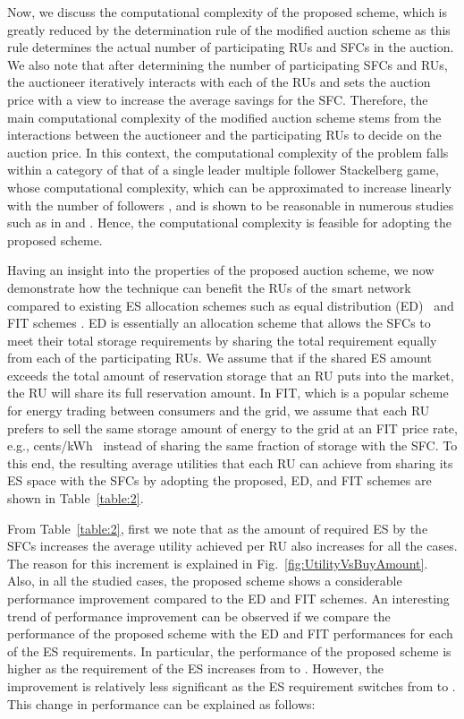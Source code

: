 \documentclass[journal,10pt]{IEEEtran}
\begin{document}
Now, we discuss the computational complexity of the proposed scheme, which is greatly reduced by the determination rule of the modified auction scheme as this rule determines the actual number of participating RUs and SFCs in the auction. We also note that after determining the number of participating SFCs and RUs, the auctioneer iteratively interacts with each of the RUs and sets the auction price with a view to increase the average savings for the SFC. Therefore, the main computational complexity of the modified auction scheme stems from the interactions between the auctioneer and the participating RUs to decide on the auction price. In this context, the computational complexity of the problem falls within a category of that of a single leader multiple follower Stackelberg game, whose computational complexity, which can be approximated to increase linearly with the number of followers \cite{Wayes-J-TSG:2012}, and is shown to be reasonable in numerous studies such as in \cite{Tushar-TIE:2014} and \cite{Wayes-J-TSG:2012}. Hence, the computational complexity is feasible for adopting the proposed scheme.

Having an insight into the properties of the proposed auction scheme, we now demonstrate how the technique can benefit the RUs of the smart network compared to existing ES allocation schemes such as equal distribution (ED)~\cite{Wayes-J-TSG:2012} and FIT schemes \cite{Goran:2011}. ED is essentially an allocation scheme that allows the SFCs to meet their total storage requirements by sharing the total requirement equally from each of the participating RUs. We assume that if the shared ES amount exceeds the total amount of reservation storage that an RU puts into the market, the RU will share its full reservation amount. In FIT, which is a popular scheme for energy trading between consumers and the grid, we assume that each RU prefers to sell the same storage amount of energy to the grid at an FIT price rate, e.g.,  cents/kWh~\cite{LIPA} instead of sharing the same fraction of storage with the SFC. To this end, the resulting average utilities that each RU can achieve from sharing its ES space with the SFCs by adopting the proposed, ED, and FIT schemes are shown in Table~\ref{table:2}.

From Table~\ref{table:2}, first we note that as the amount of required ES by the SFCs increases the average utility achieved per RU also increases for all the cases. The reason for this increment is explained in Fig.~\ref{fig:UtilityVsBuyAmount}. Also, in all the studied cases, the proposed scheme shows a considerable performance improvement compared to the ED  and FIT schemes. An interesting trend of performance improvement can be observed if we compare the performance of the proposed scheme with the ED and FIT performances for each of the ES requirements. In particular, the performance of the proposed scheme is higher as the requirement of the ES increases from  to . However, the improvement is relatively less significant as the ES requirement switches from  to . This change in performance can be explained as follows:
\end{document}
